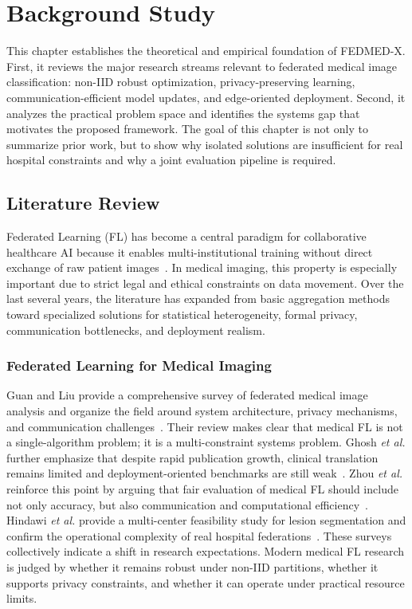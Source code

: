 \chapter{Background Study}

This chapter establishes the theoretical and empirical foundation of FEDMED-X.
First, it reviews the major research streams relevant to federated medical
image classification: non-IID robust optimization, privacy-preserving
learning, communication-efficient model updates, and edge-oriented deployment.
Second, it analyzes the practical problem space and identifies the systems
gap that motivates the proposed framework. The goal of this chapter is not
only to summarize prior work, but to show why isolated solutions are
insufficient for real hospital constraints and why a joint evaluation
pipeline is required.

\section{Literature Review}
Federated Learning (FL) has become a central paradigm for collaborative
healthcare AI because it enables multi-institutional training without direct
exchange of raw patient images~\cite{mcmahan2017communication,
guan2024federated}. In medical imaging, this property is especially important
due to strict legal and ethical constraints on data movement. Over the last
several years, the literature has expanded from basic aggregation methods
toward specialized solutions for statistical heterogeneity, formal privacy,
communication bottlenecks, and deployment realism.

\subsection{Federated Learning for Medical Imaging}
Guan and Liu provide a comprehensive survey of federated medical image
analysis and organize the field around system architecture, privacy
mechanisms, and communication challenges~\cite{guan2024federated}. Their
review makes clear that medical FL is not a single-algorithm problem; it is a
multi-constraint systems problem. Ghosh \emph{et al.} further emphasize that
despite rapid publication growth, clinical translation remains limited and
deployment-oriented benchmarks are still weak~\cite{ghosh2026advancements}.
Zhou \emph{et al.} reinforce this point by arguing that fair evaluation of
medical FL should include not only accuracy, but also communication and
computational efficiency~\cite{zhou2025federated}. Hindawi \emph{et al.}
provide a multi-center feasibility study for lesion segmentation and confirm
the operational complexity of real hospital
federations~\cite{hindawi2025federated}. These surveys collectively indicate
a shift in research expectations. Modern medical FL research is judged by
whether it remains robust under non-IID partitions, whether it supports
privacy constraints, and whether it can operate under practical resource
limits.

